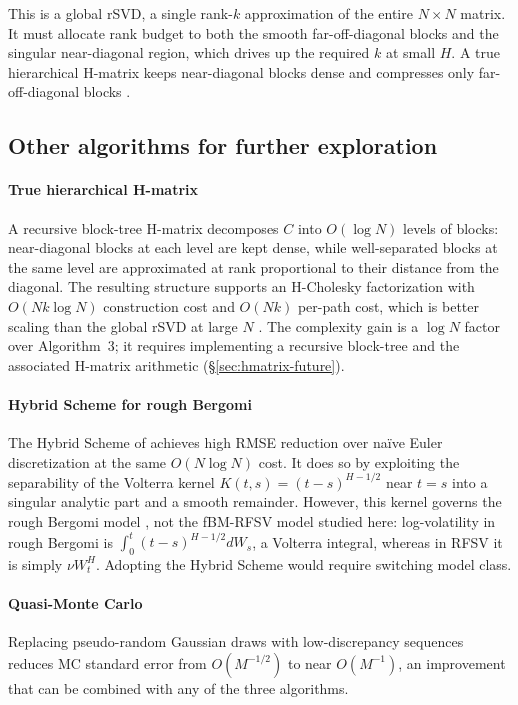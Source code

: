 This is a global rSVD, a single rank-$k$ approximation of the entire
$N\times N$ matrix.  It must allocate rank budget to both the smooth far-off-diagonal
blocks and the singular near-diagonal region, which drives up the required $k$
at small $H$.  A true hierarchical H-matrix keeps near-diagonal blocks dense and
compresses only far-off-diagonal blocks \citep{hackbusch2015hierarchical}.

\subsection{Other algorithms for further exploration}

\paragraph{True hierarchical H-matrix}
A recursive block-tree H-matrix decomposes $C$ into $O(\log N)$ levels of blocks:
near-diagonal blocks at each level are kept dense, while well-separated blocks at the
same level are approximated at rank proportional to their distance from the diagonal.
The resulting structure supports an H-Cholesky factorization with $O(Nk\log N)$
construction cost and $O(Nk)$ per-path cost, which is better scaling than the global rSVD
at large $N$ \citep{hackbusch2015hierarchical, bebendorf2008hierarchical}.
The complexity gain is a $\log N$ factor over Algorithm~3; it requires implementing
a recursive block-tree and the associated H-matrix arithmetic (§\ref{sec:hmatrix-future}).

\paragraph{Hybrid Scheme for rough Bergomi}
The Hybrid Scheme of \citet{bennedsen2017hybrid} achieves high RMSE reduction
over naïve Euler discretization at the same $O(N\log N)$ cost.  It does so by
exploiting the separability of the Volterra kernel $K(t,s) = (t-s)^{H-1/2}$ near
$t=s$ into a singular analytic part and a smooth remainder.  However, this kernel
governs the rough Bergomi model \citep{bayer2016pricing}, not the fBM-RFSV
model studied here: log-volatility in rough Bergomi is $\int_0^t (t-s)^{H-1/2}dW_s$,
a Volterra integral, whereas in RFSV it is simply $\nu W_t^H$.  Adopting the Hybrid
Scheme would require switching model class.

\paragraph{Quasi-Monte Carlo}
Replacing pseudo-random Gaussian draws with low-discrepancy sequences
\citep{niederreiter1992random} reduces MC standard error from $O(M^{-1/2})$ to near
$O(M^{-1})$, an improvement that can be combined with any of the three algorithms.